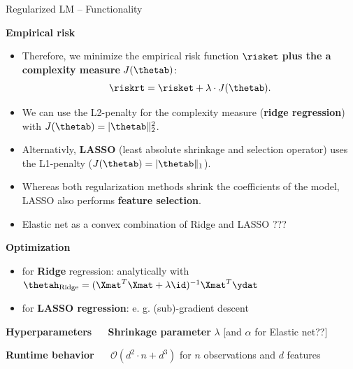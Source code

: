 \documentclass[11pt,compress,t,notes=noshow, xcolor=table]{beamer}
\newcommand{\highlight}[1]{\textcolor{highlightcol}{\textbf{#1}}}
\begin{document}
\begin{frame}{Regularized LM -- Functionality}

\footnotesize

\highlight{Empirical risk}

\begin{itemize}

\item Therefore, we minimize the empirical risk function $\risket$ \textbf{plus the a complexity measure} $J(\thetab)$:
  $$
  \riskrt = \risket + \lambda \cdot J(\thetab). 
  $$ 
  
\item We can use the L2-penalty for the complexity measure (\textbf{ridge regression}) with $J(\thetab) = |\thetab\|_2^2 $. 

\item Alternativly, \textbf{LASSO} (least absolute shrinkage and selection operator) uses the L1-penalty ($J(\thetab) = |\thetab\|_1 $).

\item Whereas both regularization methods shrink the coefficients of the model, LASSO also performs \textbf{feature selection}. 

\item Elastic net as a convex combination of Ridge and LASSO ???
  
  
\end{itemize}





\medskip

\highlight{Optimization} ~~
\begin{itemize}\footnotesize
  \item for \textbf{Ridge} regression: analytically with $\thetah_{\text{Ridge}} = (\Xmat^T \Xmat  + \lambda \id)^{-1} \Xmat^T\ydat$
  \item for \textbf{LASSO regression}: e. g. (sub)-gradient descent
\end{itemize}

\medskip

\highlight{Hyperparameters} ~~ \textbf{Shrinkage parameter} $\lambda$ [and $\alpha$ for Elastic net??] \\

\medskip

\highlight{Runtime behavior} ~~ $\mathcal{O}(d^2 \cdot n + d^3)$ for $n$ 
observations and $d$ features 

\end{frame}
\end{document}
